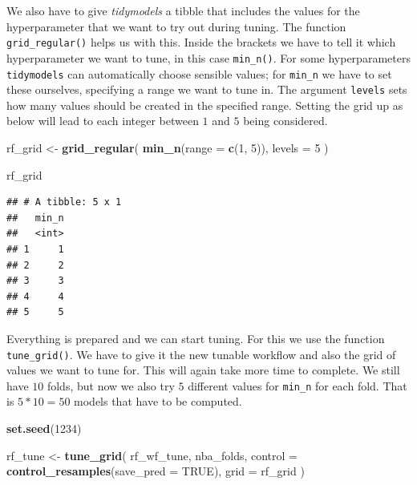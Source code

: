 \documentclass[
]{book}
\newenvironment{Shaded}{\begin{snugshade}}{\end{snugshade}}
\newcommand{\AttributeTok}[1]{\textcolor[rgb]{0.13,0.29,0.53}{#1}}
\newcommand{\ConstantTok}[1]{\textcolor[rgb]{0.56,0.35,0.01}{#1}}
\newcommand{\DecValTok}[1]{\textcolor[rgb]{0.00,0.00,0.81}{#1}}
\newcommand{\FunctionTok}[1]{\textcolor[rgb]{0.13,0.29,0.53}{\textbf{#1}}}
\newcommand{\NormalTok}[1]{#1}
\newcommand{\OtherTok}[1]{\textcolor[rgb]{0.56,0.35,0.01}{#1}}
\begin{document}
We also have to give \emph{tidymodels} a tibble that includes the values for the
hyperparameter that we want to try out during tuning.
The function \texttt{grid\_regular()} helps us with this. Inside the brackets we have to
tell it which hyperparameter we want to tune, in this case \texttt{min\_n()}. For some
hyperparameters \texttt{tidymodels} can automatically choose sensible values; for
\texttt{min\_n} we have to set these ourselves, specifying a range we want to tune in.
The argument \texttt{levels} sets how many values should be
created in the specified range. Setting the grid up as below will lead to each
integer between \(1\) and \(5\) being considered.

\begin{Shaded}
\begin{Highlighting}[]
\NormalTok{rf\_grid }\OtherTok{\textless{}{-}} \FunctionTok{grid\_regular}\NormalTok{(}
  \FunctionTok{min\_n}\NormalTok{(}\AttributeTok{range =} \FunctionTok{c}\NormalTok{(}\DecValTok{1}\NormalTok{, }\DecValTok{5}\NormalTok{)),}
  \AttributeTok{levels =} \DecValTok{5}
\NormalTok{)}

\NormalTok{rf\_grid}
\end{Highlighting}
\end{Shaded}

\begin{verbatim}
## # A tibble: 5 x 1
##   min_n
##   <int>
## 1     1
## 2     2
## 3     3
## 4     4
## 5     5
\end{verbatim}

Everything is prepared and we can start tuning. For this we use the function
\texttt{tune\_grid()}. We have to give it the new tunable workflow and also the grid of
values we want to tune for. This will again take more time to complete. We still
have \(10\) folds, but now we also try \(5\) different values for \texttt{min\_n} for each
fold. That is \(5 * 10 = 50\) models that have to be computed.

\begin{Shaded}
\begin{Highlighting}[]
\FunctionTok{set.seed}\NormalTok{(}\DecValTok{1234}\NormalTok{)}

\NormalTok{rf\_tune }\OtherTok{\textless{}{-}} \FunctionTok{tune\_grid}\NormalTok{(}
\NormalTok{  rf\_wf\_tune,}
\NormalTok{  nba\_folds,}
  \AttributeTok{control =} \FunctionTok{control\_resamples}\NormalTok{(}\AttributeTok{save\_pred =} \ConstantTok{TRUE}\NormalTok{),}
  \AttributeTok{grid =}\NormalTok{ rf\_grid}
\NormalTok{)}
\end{Highlighting}
\end{Shaded}
\end{document}

